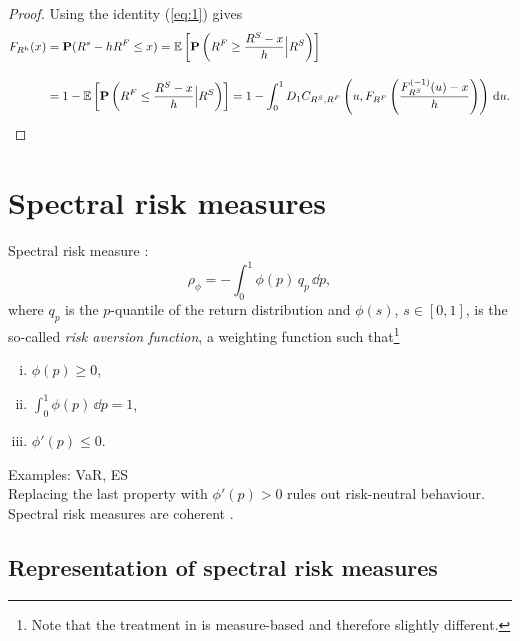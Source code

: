 \documentclass[square]{article} %
\theoremstyle{plain}
\theoremstyle{definition} %
\begin{document}
\begin{proof}
  Using the identity (\ref{eq:1}) gives
  \begin{align*}
    F_{R^h}(x) &= \p(R^s - h R^F\leq x) %
                 = \E\left[\p\left(R^F\geq \frac{R^S-x}{h}\Big|
                 R^S\right)\right]\\[10pt]
               &= 1-\E\left[\p\left(R^F\leq \frac{R^S-x}{h}\Big|
                 R^S\right)\right]%
               = 1- \int_0^1 D_1 C_{R^S, R^F}\left(u,
                 F_{R^F}\left(\frac{F^{(-1)}_{R^S}(u) -
                 x}{h}\right)\right)\, \dd u.
  \end{align*}
\end{proof}



\section{Spectral risk measures}
\label{sec:spectr-risk-meas}

Spectral risk measure \citep{Acerbi2002,Cotter2006}:
\begin{equation*}
\rho_\phi = -\int_0^1 \phi(p)\, q_p\, \dd p,
\end{equation*}
where $q_p$ is the $p$-quantile of the return distribution and
$\phi(s)$, $s\in [0,1]$, is the so-called {\em risk aversion
  function\/}, a weighting function such that\footnote{Note that the
  treatment in \citep{Acerbi2002} is measure-based and therefore
  slightly different.} 
\begin{enumerate}[(i)]
\item $\phi(p)\geq 0$,
\item $\int_0^1\phi(p)\, \dd p=1$,
\item $\phi'(p)\leq 0$. 
\end{enumerate}
Examples: VaR, ES\\
Replacing the last property with $\phi'(p)>0$ rules out risk-neutral
behaviour. \\
Spectral risk measures are coherent \citep{Acerbi2002}. 

\subsection{Representation of spectral risk measures}
\label{sec:repr-spectr-risk}
\end{document}
